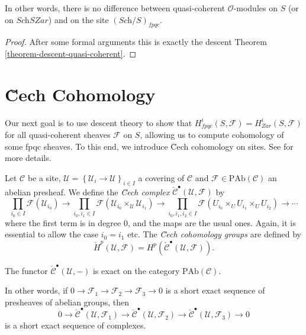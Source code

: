 \noindent
In other words, there is no difference between quasi-coherent 
$\mathcal{O}$-modules on $S$ (or on $\textit{Sch}SZar$) and on the site 
$(\textit{Sch}/S)_{fpqc}$.
  
\begin{proof} 
After some formal arguments this is exactly the descent Theorem 
\ref{theorem-descent-quasi-coherent}.
\end{proof}





\section{\u Cech Cohomology}
\label{section-cech-cohomology}

\noindent
Our next goal is to use descent theory to show that $H_{fpqc}^i(S, \mathcal{F}) 
= H_{Zar}^i(S, \mathcal{F})$ for all quasi-coherent  sheaves $\mathcal{F}$ on 
$S$, allowing us to compute cohomology of some fpqc sheaves.  To this end, we 
introduce \u Cech cohomology on sites. See \cite{ArtinTopologies} for more 
details.
 
\begin{definition} 
\label{definition-cech-complex}
Let $\mathcal{C}$ be a site, $\mathcal{U}=\left\{\mathcal{U}_i\to 
\mathcal{U}\right\}_{i\in I}$ a covering of $\mathcal{C}$ and $\mathcal{F}\in 
\text{PAb}(\mathcal{C})$ an abelian presheaf. We define the
{\it \u Cech complex}
$\check{\mathcal{C}}^\bullet(\mathcal{U}, \mathcal{F})$ by 
$$ 
 \prod_{i_0\in I}\mathcal{F}(\mathcal{U}_{i_0}) \to \prod_{i_0, 
i_1\in I}\mathcal{F}\left(\mathcal{U}_{i_0}\times_{\mathcal{U}} 
\mathcal{U}_{i_1}\right) \to \prod_{i_0, i_1, i_2 \in I} 
\mathcal{F}\left(U_{i_0}\times_U U_{i_1} \times_U U_{i_2}\right) \to \cdots
$$
where the first term is in degree 0, and the maps are the usual ones. Again, it 
is essential to allow the case $i_0 = i_1$ etc. The
{\it \u Cech cohomology groups} are defined by
$$
\check{H}^p(\mathcal{U}, \mathcal{F})= 
H^p(\check{\mathcal{C}}^\bullet\left(\mathcal{U}, \mathcal{F}\right)).
$$
\end{definition}

\begin{lemma}
\label{lemma-cech-presheaves}
The functor $\check{\mathcal{C}}^\bullet(\mathcal{U}, -)$ is exact on the 
category $\text{PAb}(\mathcal{C})$. 
\end{lemma}	
  
\noindent
In other words, if $0\to \mathcal{F}_1\to \mathcal{F}_2\to \mathcal{F}_3\to 0$ 
is a short exact sequence of presheaves of abelian groups, then  
$$
0 \to \check{\mathcal{C}}^\bullet\left(\mathcal{U}, \mathcal{F}_1\right) 
\to\check{\mathcal{C}}^\bullet(\mathcal{U}, \mathcal{F}_2) \to 
\check{\mathcal{C}}^\bullet(\mathcal{U}, \mathcal{F}_3)\to 0 
$$
is a short exact sequence of complexes.
  

